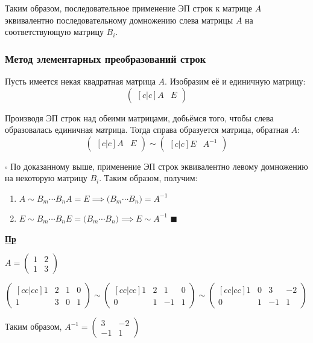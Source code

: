 \documentclass[12pt, a4paper]{report}
\newcommand{\ex}{\begin{flushleft}\textbf{\underline{Пр}}\end{flushleft}}
\begin{document}
	\bigskip Таким образом, последовательное применение ЭП строк к матрице \(A\) эквивалентно последовательному домножению слева матрицы \(A\) на соответствующую матрицу \(B_{i}\).
	
	\subsubsection{Метод элементарных преобразований строк}\leavevmode
	
	Пусть имеется некая квадратная матрица \(A\). Изобразим её и единичную матрицу: \[\begin{pmatrix}[c|c]A&E\end{pmatrix}\]
	
	Производя ЭП строк над обеими матрицами, добьёмся того, чтобы слева образовалась единичная матрица. Тогда справа образуется матрица, обратная \(A\): \[\begin{pmatrix}[c|c]A&E\end{pmatrix}\sim\begin{pmatrix}[c|c]E&A^{-1}\end{pmatrix}\]
	
	\newpage\(\square\) По доказанному выше, применение ЭП строк эквивалентно левому домножению на некоторую матрицу \(B_{i}\). Таким образом, получим:
	
	\begin{enumerate}[{4.}1)]
		\item \(A\sim B_{m}\dotsb B_{n}A=E\implies \big(B_{m}\dotsb B_{n}\big) = A^{-1}\)
		\item \(E\sim B_{m}\dotsb B_{n}E = \big(B_{m}\dotsb B_{n}\big)\implies E\sim A^{-1}\) \(\blacksquare\)
	\end{enumerate}
	\ex
	
	\(A=\begin{pmatrix}1&2\\1&3\end{pmatrix}\)
	
	\bigskip\(\begin{pmatrix}[cc|cc]1&2&1&0\\1&3&0&1\end{pmatrix}\sim\begin{pmatrix}[cc|cc]1&2&1&0\\0&1&-1&1\end{pmatrix}\sim\begin{pmatrix}[cc|cc]1&0&3&-2\\0&1&-1&1\end{pmatrix}\)
	
	\bigskip Таким образом, \(A^{-1}=\begin{pmatrix}3&-2\\-1&1\end{pmatrix}\)
	
\end{document}
